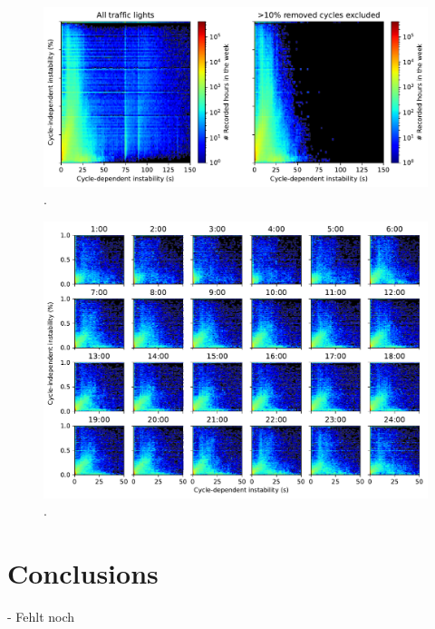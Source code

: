 \begin{figure}[t]
    \centering
    \includegraphics[width=\linewidth]{images/predictability-heatmap.pdf}
    \caption{.}\label{fig:}
\end{figure}

\begin{figure}[t]
    \centering
    \includegraphics[width=\linewidth]{images/predictability-heatmap-hourly.pdf}
    \caption{.}\label{fig:}
\end{figure}


\section{Conclusions}

- Fehlt noch
